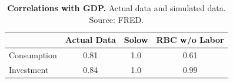 \begin{table}[h] \caption{\label{tab013_intro_rbc_modeling_solow_rbc_without_labor_corrs} \textbf{Correlations with GDP.} Actual data and simulated data. {\tiny Source: FRED}.}
\begin{center}\hspace*{-.5cm}

\begin{tabular}{lccc}
\toprule
{} &  Actual Data &  Solow &  RBC w/o Labor \\
\midrule
Consumption &         0.81 &    1.0 &           0.61 \\
Investment  &         0.84 &    1.0 &           0.99 \\
\bottomrule
\end{tabular}
\end{center}
\end{table}